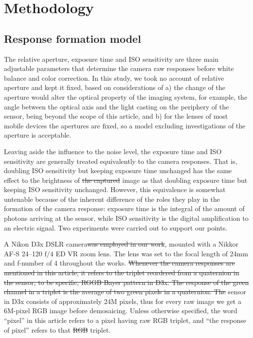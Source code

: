 \documentclass[9pt,twocolumn,twoside]{osajnl}
\providecommand{\DIFadd}[1]{{\protect\color{blue}\uwave{#1}}} %
\providecommand{\DIFdel}[1]{{\protect\color{red}\sout{#1}}}                      %
\providecommand{\DIFaddbegin}{} %
\providecommand{\DIFaddend}{} %
\providecommand{\DIFdelbegin}{} %
\providecommand{\DIFdelend}{} %
\begin{document}
	\section{Methodology}\label{sec:methodology}

	\subsection{Response formation model}\label{sec:response formation model}

	The relative aperture, exposure time and ISO sensitivity are three main adjustable parameters that determine the camera raw responses before white balance and color correction. In this study, we took no account of relative aperture and kept it fixed, based on considerations of a) the change of the aperture would alter the optical property of the imaging system, for example, the angle between the optical axis and the light casting on the periphery of the sensor, being beyond the scope of this article, and b) for the lenses of most mobile devices the apertures are fixed, so a model excluding investigations of the aperture is acceptable.

	Leaving aside the influence to the noise level, the exposure time and ISO sensitivity are generally treated equivalently to the camera responses. That is, doubling ISO sensitivity but keeping exposure time unchanged has the same effect to the brightness of \DIFdelbegin \DIFdel{the captured }\DIFdelend image as that doubling exposure time but keeping ISO sensitivity unchanged. However, this equivalence is somewhat untenable because of the inherent difference of the roles they play in the formation of the camera response: exposure time is the integral of the amount of photons arriving at the sensor, while ISO sensitivity is the digital amplification to an electric signal. Two experiments were carried out to support our points.

	A Nikon D3x DSLR camera\DIFdelbegin \DIFdel{was employed in our work}\DIFdelend , mounted with a Nikkor AF-S 24--120 $\text{f}/4$ ED VR zoom lens\DIFaddbegin \DIFadd{, was employed in our work}\DIFaddend . The lens was set to the focal length of 24mm and f-number of 4 throughout the works. \DIFdelbegin \DIFdel{Whenever the camera responses are mentioned in this article, it refers to the triplet reordered from a quaternion in the sensor, to be specific, RGGB Bayer pattern in D3x. The response of the green channel in a triplet is the average of two green pixels in a quaternion. The }\DIFdelend \DIFaddbegin \DIFadd{The }\DIFaddend sensor in D3x consists of approximately 24M pixels, thus for every raw image we get a 6M-pixel RGB image before demosaicing. Unless otherwise specified, the word “pixel” in this article refers to a pixel having raw RGB triplet, and “the response of pixel” refers to that \DIFdelbegin \DIFdel{RGB }\DIFdelend triplet.
\end{document}
